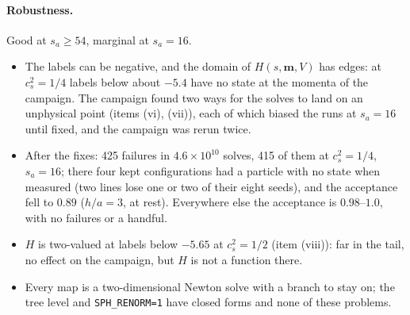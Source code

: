 \documentclass[11pt,aps,preprint,nofootinbib,superscriptaddress,tightenlines]{revtex4-2}
\let\oldparagraph\paragraph
\renewcommand{\paragraph}{\par\bigskip\oldparagraph}
\begin{document}
\paragraph{Robustness.}  Good at $s_a\ge54$, marginal at $s_a=16$.
\begin{itemize}
\item The labels can be negative, and the domain of $H(s,\bm m,V)$ has edges: at $c_s^2=1/4$ labels below about $-5.4$ have no state at the momenta of the
  campaign.  The campaign found two ways for the solves to land on an unphysical point (items (vi), (vii)), each of which biased the runs at $s_a=16$ until
  fixed, and the campaign was rerun twice.
\item After the fixes: 425 failures in $4.6\times10^{10}$ solves, 415 of them at $c_s^2=1/4$, $s_a=16$; there four kept configurations had a particle with no
  state when measured (two lines lose one or two of their eight seeds), and the acceptance fell to $0.89$ ($h/a=3$, at rest).  Everywhere else the
  acceptance is $0.98$--$1.0$, with no failures or a handful.
\item $H$ is two-valued at labels below $-5.65$ at $c_s^2=1/2$ (item (viii)): far in the tail, no effect on the campaign, but $H$ is not a function there.
\item Every map is a two-dimensional Newton solve with a branch to stay on; the tree level and \texttt{SPH\_RENORM=1} have closed forms and none of these
  problems.
\end{itemize}
\end{document}
